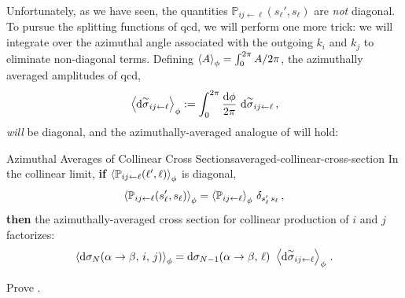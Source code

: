 Unfortunately, as we have seen, the quantities \(\mathbb{P}_{ij \leftarrow \ell}(s_{\ell}', s_\ell)\) are \textit{not} diagonal.
%
To pursue the splitting functions of \gls{qcd}, we will perform one more trick:
%
we will integrate over the azimuthal angle associated with the outgoing \(k_i\) and \(k_j\) to eliminate non-diagonal terms.
%
Defining \(\left\langle A \right\rangle_\phi = \int_0^{2\pi} A / 2\pi\), the azimuthally averaged amplitudes of \gls{qcd},
\begin{align}
    \left\langle \dd \overset{\sim}{\sigma}_{ij\leftarrow \ell}\right \rangle_\phi
    :=
    \int_0^{2\pi} \frac{\dd \phi}{2\pi}
    \,\,
    \dd \overset{\sim}{\sigma}_{ij\leftarrow \ell}
    \,,
\end{align}
\textit{will} be diagonal, and the azimuthally-averaged analogue of  will hold:


\begin{lemma}{Azimuthal Averages of Collinear Cross Sections}{averaged-collinear-cross-section}
    In the collinear limit, \textbf{if} \(\left\langle\mathbb{P}_{ij \leftarrow \ell}(\ell', \ell)\right\rangle_\phi\) is diagonal,
    \begin{align}
        \left\langle\mathbb{P}_{ij \leftarrow \ell}(s_\ell', s_\ell)\right\rangle_\phi
        =
        \left\langle\mathbb{P}_{ij \leftarrow \ell}\right\rangle_\phi
        \,
        \delta_{s_\ell'\, s_\ell}
        \,,
    \end{align}
    \textbf{then} the azimuthally-averaged cross section for collinear production of \(i\) and \(j\) factorizes:
    \begin{align}
        \left\langle
        \dd \sigma_N(\alpha \to \beta,\,i,\, j)
        \right\rangle_\phi
        =
        \dd \sigma_{N-1}(\alpha \to \beta,\,\ell)
        \,\,
        \left\langle
        \dd \overset{\sim}{\sigma}_{ij\leftarrow \ell}
        \right\rangle_\phi
        \,.
    \end{align}
\end{lemma}

\begin{exercise}
    Prove .
\end{exercise}


\begin{example}
    \label{ex:qcd-averaged-splitting}
\end{example}




